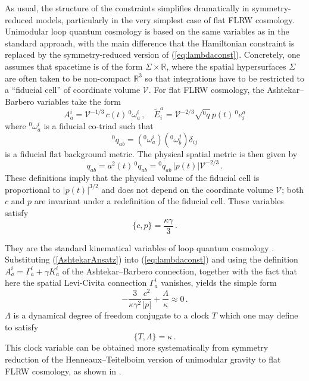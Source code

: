\documentclass[aps,prd,11pt,showkeys,nofootinbib]{revtex4-2}
\begin{document}
As usual, the structure of the constraints simplifies dramatically in symmetry-reduced models, particularly in the very simplest case of flat FLRW cosmology. Unimodular loop quantum cosmology is based on the same variables as in the standard approach, with the main difference that the Hamiltonian constraint is replaced by the symmetry-reduced version of (\ref{eq:lambdaconst}). Concretely, one assumes that spacetime is of the form $\Sigma\times\mathbb{R}$, where the spatial hypersurfaces $\Sigma$ are often taken to be non-compact $\mathbb{R}^3$ so that integrations have to be restricted to a ``fiducial cell'' of coordinate volume $\mathcal{V}$. For flat FLRW cosmology, the Ashtekar--Barbero variables take the form
\begin{equation}
    A^i_a = \mathcal{V}^{-1/3}\,c(t)\,{}^0\omega^i_a\,,\quad \tilde{E}^a_i = \mathcal{V}^{-2/3}\sqrt{{}^0 q}\,p(t)\,{}^0 e^a_i
    \label{AshtekarAnsatz}
\end{equation}
where ${}^0\omega^i_a$ is a fiducial co-triad such that
\begin{equation}
    {}^0 q_{ab}=({}^0\omega^i_a)({}^0\omega^j_b)\delta_{ij}
\end{equation}
is a fiducial flat background metric. The physical spatial metric is then given by
\begin{equation}
    q_{ab}=a^2(t)\, {}^0 q_{ab} = {}^0 q_{ab}\,|p(t)|\mathcal{V}^{-2/3}\,.
    \label{eq:physmetric}
\end{equation}
These definitions imply that the physical volume of the fiducial cell is proportional to $|p(t)|^{3/2}$ and does not depend on the coordinate volume $\mathcal{V}$; both $c$ and $p$ are invariant under a redefinition of the fiducial cell. These variables satisfy
\begin{equation}
    \{c,p\} = \frac{\kappa\gamma }{3}\,.
\end{equation}

They are the standard kinematical variables of loop quantum cosmology \cite{Banerjee:2011qu}. Substituting (\ref{AshtekarAnsatz}) into (\ref{eq:lambdaconst}) and using the definition $A^i_a=\Gamma^i_a+\gamma K^i_a$ of the Ashtekar--Barbero connection, together with the fact that here the spatial Levi-Civita connection $\Gamma^i_a$ vanishes, yields the simple form
\begin{equation}
   -\frac{3}{\kappa\gamma^2}\frac{c^2}{|p|} + \frac{\Lambda}{\kappa} \approx 0 \,.
\end{equation}
$\Lambda$ is a dynamical degree of freedom conjugate to a clock $T$ which one may define to satisfy
\begin{equation}
    \{T,\Lambda\} = \kappa\,.
\end{equation}
This clock variable can be obtained more systematically from symmetry reduction of the Henneaux--Teitelboim version of unimodular gravity \cite{Henneaux:1989zc} to flat FLRW cosmology, as shown in \cite{Chiou:2010ne}.
\end{document}
